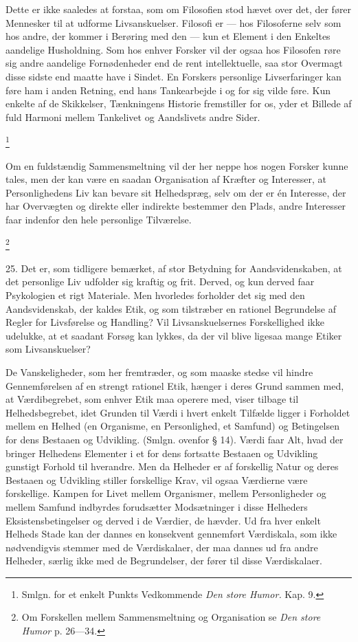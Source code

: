 \documentclass[12pt]{article}
\newcommand{\apage}[1]{\marginnote{\footnotesize\textit{[#1]}}}
\begin{document}
Dette er ikke saaledes at forstaa, som om Filosofien stod hævet over det, der
fører Mennesker til at udforme Livsanskuelser. Filosofi er --- hos Filosoferne
selv som hos andre, der kommer i Berøring med den --- kun et Element i den
Enkeltes aandelige Husholdning. Som hos enhver Forsker vil der ogsaa hos
Filosofen røre sig andre aandelige Fornødenheder end de rent intellektuelle,
saa stor Overmagt disse sidste end maatte have i Sindet. En Forskers personlige
Livserfaringer kan føre ham i anden Retning, end hans Tankearbejde i og for sig
vilde føre. Kun enkelte af de Skikkelser, Tænkningens Historie fremstiller for
os, yder et Billede af fuld Harmoni mellem Tankelivet og Aandslivets andre Sider.

         \footnote{Smlgn. for et enkelt Punkts Vedkommende \textit{Den store
Humor. }Kap. 9.}

       Om en fuldstændig Sammensmeltning vil der her neppe hos nogen Forsker
kunne tales, men der kan være en saadan Organisation af Kræfter og Interesser,
at Personlighedens Liv kan bevare sit Helhedspræg, selv om der er én Interesse,
der har Overvægten
\setcounter{footnote}{0}%
\apage{77}og direkte eller indirekte bestemmer den Plads, andre Interesser faar
indenfor den hele personlige Tilværelse.

         \footnote{Om Forskellen mellem Sammensmeltning og Organisation se
\textit{Den store Humor} p. 26---34.}

25. Det er, som tidligere bemærket, af stor Betydning for Aandsvidenskaben, at
det personlige Liv udfolder sig kraftig og frit. Derved, og kun derved faar
Psykologien et rigt Materiale. Men hvorledes forholder det sig med den
Aandsvidenskab, der kaldes Etik, og som tilstræber en rationel Begrundelse af
Regler for Livsførelse og Handling? Vil Livsanskuelsernes Forskellighed ikke
udelukke, at et saadant Forsøg kan lykkes, da der vil blive ligesaa mange
Etiker som Livsanskuelser?

De Vanskeligheder, som her fremtræder, og som maaske stedse vil hindre
Gennemførelsen af en strengt rationel Etik, hænger i deres Grund sammen med, at
Værdibegrebet, som enhver Etik maa operere med, viser tilbage til
Helhedsbegrebet, idet Grunden til Værdi i hvert enkelt Tilfælde ligger i
Forholdet mellem en Helhed (en Organisme, en Personlighed, et Samfund) og
Betingelsen for dens Bestaaen og Udvikling. (Smlgn. ovenfor § 14). Værdi faar
Alt, hvad der bringer Helhedens Elementer i et for dens fortsatte Bestaaen og
Udvikling gunstigt Forhold til hverandre. Men da Helheder er af forskellig
Natur og deres Bestaaen og Udvikling stiller forskellige Krav, vil ogsaa
Værdierne være forskellige. Kampen for Livet mellem Organismer, mellem
Personligheder og mellem Samfund indbyrdes forudsætter Modsætninger i disse
Helheders Eksistensbetingelser og derved i de Værdier, de hævder. Ud fra hver
enkelt Helheds Stade kan der dannes en konsekvent gennemført Værdiskala, som
ikke nødvendigvis stemmer med de Værdiskalaer, der maa dannes ud fra andre
Helheder, særlig
\setcounter{footnote}{0}%
\apage{78}ikke med de Begrundelser, der fører til disse Værdiskalaer.
\end{document}
